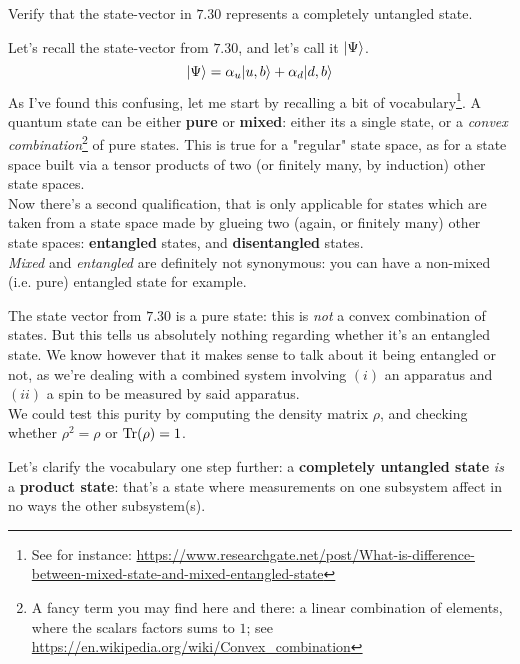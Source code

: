 \documentclass[solutions.tex]{subfiles}
\begin{document}
\maketitle
\begin{exercise} Verify that the state-vector in $7.30$ represents a completely
untangled state.
\end{exercise}
Let's recall the state-vector from $7.30$, and let's call it $|\Psi\rangle$.
\[
	|\Psi\rangle = \alpha_u|u,b\rangle + \alpha_d|d,b\rangle
\]
As I've found this confusing, let me start by recalling
a bit of vocabulary\footnote{See for instance: \url{https://www.researchgate.net/post/What-is-difference-between-mixed-state-and-mixed-entangled-state}}.
A quantum state can be either \textbf{pure} or \textbf{mixed}: either its
a single state, or a \textit{convex combination}\footnote{A fancy term
you may find here and there: a linear combination of elements, where the
scalars factors sums to $1$; see \url{https://en.wikipedia.org/wiki/Convex_combination}}
of pure states. This is true for a "regular" state space, as for a state space built
via a tensor products of two (or finitely many, by induction) other state
spaces. \\

Now there's a second qualification, that is only applicable for states
which are taken from a state space made by glueing two (again, or finitely many)
other state spaces: \textbf{entangled} states, and \textbf{disentangled} states. \\

\textit{Mixed} and \textit{entangled} are definitely not synonymous: you can have
a non-mixed (i.e. pure) entangled state for example. \\

\begin{example} The state vector from $7.30$ is a pure state: this is \textit{not}
a convex combination of states. But this tells us absolutely nothing regarding
whether it's an entangled state. We know however that it makes sense to talk about
it being entangled or not, as we're dealing with a combined system involving
$(i)$ an apparatus and $(ii)$ a spin to be measured by said apparatus. \\

We could test this purity by computing the density matrix $\rho$, and checking
whether $\rho^2 = \rho$ or $\text{Tr}(\rho) = 1$.
\end{example}

Let's clarify the vocabulary one step further: a \textbf{completely untangled state}
\textit{is} a \textbf{product state}: that's a state where measurements on one subsystem
affect in no ways the other subsystem(s). \\
\end{document}
